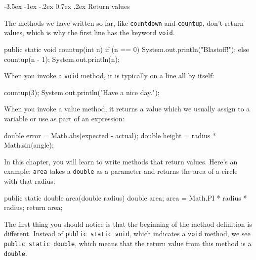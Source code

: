 \documentclass[12pt]{book}
\makeatletter
\theoremstyle{exercise}
\newcommand{\java}[1]{\verb"#1"}
\renewcommand{\section}{\@startsection {section}{1}{\z@}%
    {-3.5ex \@plus -1ex \@minus -.2ex}%
    {0.7ex \@plus.2ex}%
    {\normalfont\Large\bfseries}}
\newcommand{\java}[1]{\lstinline{#1}} %
\makeatother
\begin{document}
\section{Return values}


The methods we have written so far, like \java{countdown} and \java{countup}, don't return values, which is why the first line has the keyword \java{void}.

\begin{code}
    public static void countup(int n) {
        if (n == 0) {
            System.out.println("Blastoff!");
        } else {
            countup(n - 1);
            System.out.println(n);
        }
    }
\end{code}

When you invoke a \java{void} method, it is typically on a line all by itself:

\begin{code}
    countup(3);
    System.out.println("Have a nice day.");
\end{code}

When you invoke a value method, it returns a value which we usually assign to a variable or use as part of an expression:

\begin{code}
    double error = Math.abs(expected - actual);
    double height = radius * Math.sin(angle);
\end{code}


In this chapter, you will learn to write methods that return values.
Here's an example:  \java{area} takes a \java{double} as a parameter and returns the area of a circle with that radius:

\begin{code}
    public static double area(double radius) {
        double area;
        area = Math.PI * radius * radius;
        return area;
    }
\end{code}

The first thing you should notice is that the beginning of the method definition is different.
Instead of \java{public static void}, which indicates a \java{void} method, we see \java{public static double}, which means that the return value from this method is a \java{double}.

\end{document}
